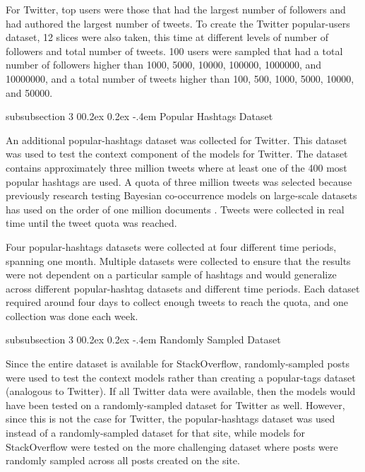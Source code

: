 \documentclass[man,floatsintext,donotrepeattitle]{apa6}
\makeatletter
\renewcommand{\subsubsection}{%
  \@startsection
  {subsubsection}%
  {3}%
  {\parindent}%
  {0\baselineskip \@plus 0.2ex \@minus 0.2ex}%
  {-.4em}%
  {\normalfont\normalsize\bfseries\addperi}}
\makeatother
\begin{document}
For Twitter, top users were those that had the largest number of followers and had authored the largest number of tweets.
To create the Twitter popular-users dataset, 12 slices were also taken, this time at different levels of number of followers and total number of tweets.
100 users were sampled that had a total number of followers higher than \num{1000}, \num{5000}, \num{10000}, \num{100000}, \num{1000000}, and \num{10000000},
and a total number of tweets higher than \num{100}, \num{500}, \num{1000}, \num{5000}, \num{10000}, and \num{50000}.

\subsubsection{Popular Hashtags Dataset}

An additional popular-hashtags dataset was collected for Twitter.
This dataset was used to test the context component of the models for Twitter.
The dataset contains approximately three million tweets where at least one of the 400 most popular hashtags are used.
A quota of three million tweets was selected because previously research testing Bayesian co-occurrence models on large-scale datasets has used on the order of one million documents
\parencites{Stanley2013,Douglass2010,Budiu2007}.
Tweets were collected in real time until the tweet quota was reached.

Four popular-hashtags datasets were collected at four different time periods, spanning one month.
Multiple datasets were collected to ensure that the results were not dependent on a particular sample of hashtags and would generalize across different popular-hashtag datasets and different time periods.
Each dataset required around four days to collect enough tweets to reach the quota, and one collection was done each week.

\subsubsection{Randomly Sampled Dataset}

Since the entire dataset is available for StackOverflow, randomly-sampled posts were used to test the context models rather than creating a popular-tags dataset (analogous to Twitter).
If all Twitter data were available, then the models would have been tested on a randomly-sampled dataset for Twitter as well.
However, since this is not the case for Twitter, the popular-hashtags dataset was used instead of a randomly-sampled dataset for that site,
while models for StackOverflow were tested on the more challenging dataset where posts were randomly sampled across all posts created on the site.
\end{document}
